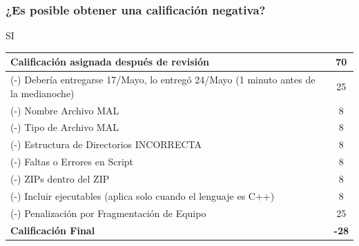 \begin{frame}
\frametitle{¿Es posible obtener una calificación negativa?}
SI
\begin{center}
\begin{tabular}{p{12cm}|c}
\hline
Calificación asignada después de revisión & 70 \\ \hline
(-) Debería entregarse 17/Mayo, lo entregó 24/Mayo (1 minuto antes de la medianoche) & 25 \\
(-) Nombre Archivo MAL & 8 \\ 
(-) Tipo de Archivo MAL & 8 \\ 
(-) Estructura de Directorios INCORRECTA & 8 \\ 
(-) Faltas o Errores en Script  & 8 \\ 
(-) ZIPs dentro del ZIP  & 8 \\ 
(-) Incluir ejecutables (aplica solo cuando el lenguaje es C++)  & 8 \\ 
(-) Penalización por Fragmentación de Equipo  & 25 \\ \hline
\textbf{Calificación Final}  & \textbf{-28} \\ 
\hline
\hline
\end{tabular}


\end{center}


\end{frame}





